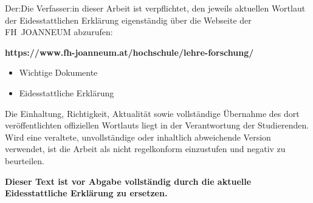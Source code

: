 %

\thispagestyle{empty}
 {\hfill\fontfamily{\sfdefault}\bfseries\fontsize{22}{22}\selectfont{Eidesstattliche Erklärung}}\vspace*{1cm}

\normalfont
\noindent Der:Die Verfasser:in dieser Arbeit ist verpflichtet, den jeweils aktuellen Wortlaut der Eidesstattlichen Erklärung eigenständig über die Webseite der FH~JOANNEUM abzurufen:

\begin{center}	
    \textbf{https://www.fh-joanneum.at/hochschule/lehre-forschung/}
	\begin{itemize}
		\item Wichtige Dokumente
		\item Eidesstattliche Erklärung
	\end{itemize}	
\end{center}

\noindent Die Einhaltung, Richtigkeit, Aktualität sowie vollständige Übernahme des dort veröffentlichten offiziellen Wortlauts liegt in der Verantwortung der Studierenden. Wird eine veraltete, unvollständige oder inhaltlich abweichende Version verwendet, ist die Arbeit als nicht regelkonform einzustufen und negativ zu beurteilen.

\vspace{8mm}
\noindent \textbf{Dieser Text ist vor Abgabe vollständig durch die aktuelle Eidesstattliche Erklärung zu ersetzen.}

\vfill

\ifthenelse{\equal{\Style}{\Book}}
{
	\newpage\null\thispagestyle{empty}\newpage
}
{
}


